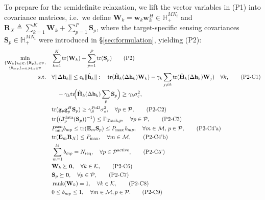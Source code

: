 \documentclass[12pt,a4paper]{article}
\newcommand{\vect}[1]{\mathbf{#1}}
\newcommand{\mat}[1]{\mathbf{#1}}
\newcommand{\tr}{\text{tr}}
\DeclareMathOperator{\rank}{rank}
\begin{document}
To prepare for the semidefinite relaxation, we lift the vector variables in (P1) into covariance matrices, i.e.\ we define $\mat{W}_k = \vect{w}_k \vect{w}_k^H \in \mathbb{H}_+^{MN_t}$ and $\mat{R}_X \triangleq \sum_{k=1}^K \mat{W}_k + \sum_{p=1}^P \mat{S}_p$, where the target-specific sensing covariances $\mat{S}_p \in \mathbb{H}_+^{MN_t}$ were introduced in \S\ref{sec:formulation}, yielding (P2):
\begin{align}
\min_{\substack{\{\mat{W}_k\}_{k\in\mathcal{K}}, \{\mat{S}_p\}_{p\in\mathcal{P}}, \\ \{b_{mp}\}_{m\in\mathcal{M},p\in\mathcal{P}}}} \quad
& \sum_{k=1}^K \tr(\mat{W}_k) + \sum_{p=1}^P \tr(\mat{S}_p) \tag{P2} \\
\text{s.t.} \quad
& \begin{aligned}[t]
&\forall \|\Delta\vect{h}_k\| \leq \epsilon_h \|\hat{\vect{h}}_k\|:\quad
\tr(\hat{\mat{H}}_k(\Delta\vect{h}_k)\mat{W}_k)
- \gamma_k \sum_{j \neq k}\tr(\hat{\mat{H}}_k(\Delta\vect{h}_k)\mat{W}_j) \\
&\quad {}- \gamma_k \tr\!\Big(\hat{\mat{H}}_k(\Delta\vect{h}_k)\sum_p\mat{S}_p\Big)
\geq \gamma_k\sigma_c^2,
\end{aligned}\quad \forall k, \tag{P2-C1} \\
& \tr(\vect{g}_p \vect{g}_p^H \mat{S}_p) \geq \gamma_S^{\text{PoD}} \sigma_s^2, \quad \forall p \in \mathcal{P}, \tag{P2-C2} \\
& \tr\big((\mat{J}_p^{\text{data}}(\mat{S}_p))^{-1}\big) \leq \Gamma_{\text{Track},p}, \quad \forall p \in \mathcal{P}, \tag{P2-C3} \label{eq:p2c3} \\
& P_{\min}^{\rm sen}b_{mp}\leq\tr(\mat{E}_m \mat{S}_p) \leq P_{\max} \, b_{mp}, \quad \forall m \in \mathcal{M}, \, p \in \mathcal{P}, \tag{P2-C4'a} \\
& \tr(\mat{E}_m \mat{R}_X) \leq P_{\max}, \quad \forall m \in \mathcal{M}, \tag{P2-C4'b} \\
& \sum_{m=1}^{M} b_{mp} = N_{\text{req}}, \quad \forall p \in \mathcal{P}^{\text{active}}, \tag{P2-C5'} \\
& \mat{W}_k \succeq \mat{0}, \quad \forall k \in \mathcal{K}, \tag{P2-C6} \\
& \mat{S}_p \succeq \mat{0}, \quad \forall p \in \mathcal{P}, \tag{P2-C7} \\
& \rank(\mat{W}_k) = 1, \quad \forall k \in \mathcal{K}, \tag{P2-C8} \\
& 0 \leq b_{mp} \leq 1, \quad \forall m \in \mathcal{M}, p \in \mathcal{P}. \tag{P2-C9}
\end{align}
\end{document}
